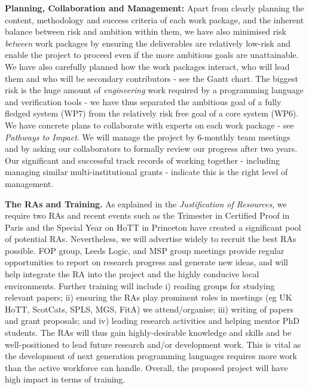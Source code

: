 \documentclass[a4paper,11pt]{article}
\begin{document}

{\bf Planning, Collaboration and Management:} Apart from clearly
planning the content, methodology and success criteria of each work package, and the inherent balance between risk and ambition
within them, we have also minimised risk {\em between} work packages
by ensuring the deliverables are relatively low-risk and
enable the project to proceed even if the
more ambitious goals are unattainable. We have also carefully planned how the work
packages interact, who will lead them and who will be secondary
contributors - see the Gantt chart. The biggest risk is the huge
amount of {\em engineering} work required by a programming language
and verification tools - we have thus separated the ambitious
goal of a fully fledged system (WP7) from the relatively risk free
goal of a core system (WP6). We have concrete plans to collaborate
with experts on each work package - see {\em Pathways to Impact}. We
will manage the project by 6-monthly team meetings and by asking our
collaborators to formally review our progress after two years.  Our
significant and successful track records of working together -
including managing similar multi-institutional grants - indicate
this is the right level of management.


{\bf The RAs and Training.} As explained in the {\em
  Justification of Resources}, we require two RAs and recent events
such as the Trimester in Certified Proof in Paris and the Special Year
on HoTT in Princeton have created a significant pool of potential
RAs. Nevertheless, we will advertise widely to recruit the best RAs
possible.  FOP group, Leeds Logic, and MSP group meetings provide
regular opportunities to report on research progress and generate new
ideas, and will help integrate the RA into the project and the highly
conducive local environments. Further training will include i) reading
groups for studying relevant papers; ii) ensuring the RAs play
prominent roles in meetings (eg UK HoTT, ScotCats, SPLS, MGS, FitA) we
attend/organise; iii) writing of papers and grant proposals; and
iv) leading research activities and helping mentor PhD students.
The RAs will thus gain highly-desirable
knowledge and skills and be well-positioned to lead future research
and/or development work. This is vital as the development of
next generation programming languages requires more work than the
active workforce can handle. Overall, the proposed project will have
high impact in terms of training.
\end{document}
